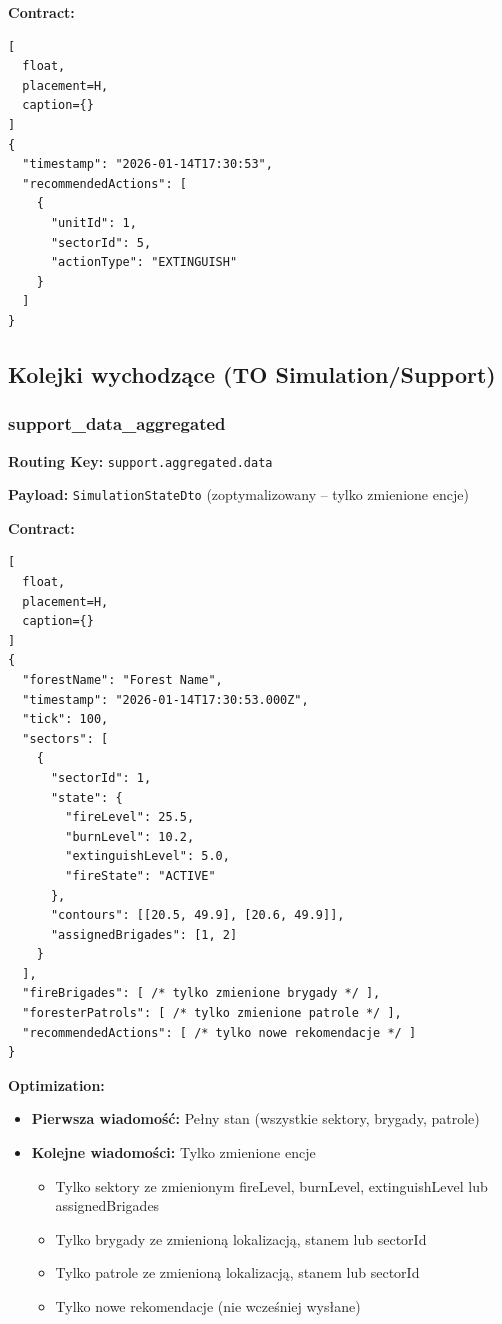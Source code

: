 \documentclass[11pt,a4paper] {article}
\begin{document}
\textbf{Contract:}
\begin{lstlisting}[
  float,
  placement=H,
  caption={}
] 
{
  "timestamp": "2026-01-14T17:30:53",
  "recommendedActions": [
    {
      "unitId": 1,
      "sectorId": 5,
      "actionType": "EXTINGUISH"
    }
  ]
}
\end{lstlisting}

\subsection{Kolejki wychodzące (TO Simulation/Support)}

\subsubsection{support\_data\_aggregated}

\textbf{Routing Key:} \texttt{support.aggregated.data}

\textbf{Payload:} \texttt{SimulationStateDto} (zoptymalizowany -- tylko zmienione encje)

\textbf{Contract:}
\begin{lstlisting}[
  float,
  placement=H,
  caption={}
] 
{
  "forestName": "Forest Name",
  "timestamp": "2026-01-14T17:30:53.000Z",
  "tick": 100,
  "sectors": [
    {
      "sectorId": 1,
      "state": {
        "fireLevel": 25.5,
        "burnLevel": 10.2,
        "extinguishLevel": 5.0,
        "fireState": "ACTIVE"
      },
      "contours": [[20.5, 49.9], [20.6, 49.9]],
      "assignedBrigades": [1, 2]
    }
  ],
  "fireBrigades": [ /* tylko zmienione brygady */ ],
  "foresterPatrols": [ /* tylko zmienione patrole */ ],
  "recommendedActions": [ /* tylko nowe rekomendacje */ ]
}
\end{lstlisting}

\textbf{Optimization:}
\begin{itemize}
    \item \textbf{Pierwsza wiadomość:} Pełny stan (wszystkie sektory, brygady, patrole)
    \item \textbf{Kolejne wiadomości:} Tylko zmienione encje
    \begin{itemize}
        \item Tylko sektory ze zmienionym fireLevel, burnLevel, extinguishLevel lub assignedBrigades
        \item Tylko brygady ze zmienioną lokalizacją, stanem lub sectorId
        \item Tylko patrole ze zmienioną lokalizacją, stanem lub sectorId
        \item Tylko nowe rekomendacje (nie wcześniej wysłane)
    \end{itemize}
\end{itemize}
\end{document}
